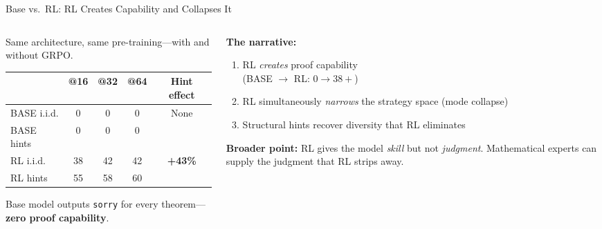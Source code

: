 \documentclass[aspectratio=169, 11pt]{beamer}
\begin{document}
\begin{frame}{Base vs.\ RL: RL Creates Capability and Collapses It}

\begin{columns}[T]
\begin{column}{0.48\textwidth}
Same architecture, same pre-training---with and without GRPO.

\vspace{0.3em}
\begin{tabular}{@{}lcccc@{}}
\toprule
& @16 & @32 & @64 & Hint effect \\
\midrule
BASE i.i.d. & 0 & 0 & 0 & \multirow{2}{*}{None} \\
BASE hints & 0 & 0 & 0 & \\
\midrule
RL i.i.d. & 38 & 42 & 42 & \multirow{2}{*}{\textbf{+43\%}} \\
RL hints & 55 & 58 & 60 & \\
\bottomrule
\end{tabular}

\vspace{0.3em}
Base model outputs \texttt{sorry} for every theorem---\textbf{zero proof capability}.
\end{column}
\begin{column}{0.48\textwidth}
\textbf{The narrative:}
\begin{enumerate}
  \item RL \emph{creates} proof capability\\(BASE $\to$ RL: $0 \to 38+$)
  \item RL simultaneously \emph{narrows} the strategy space (mode collapse)
  \item Structural hints recover diversity that RL eliminates
\end{enumerate}

\vspace{0.4em}
\textbf{Broader point:} RL gives the model \emph{skill} but not \emph{judgment}. Mathematical experts can supply the judgment that RL strips away.
\end{column}
\end{columns}
\end{frame}
\end{document}
